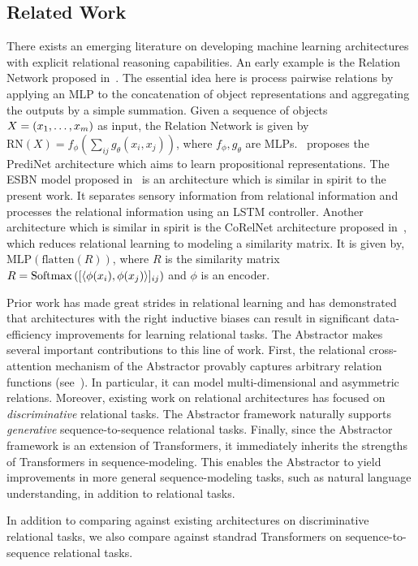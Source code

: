 \subsection{Related Work}

There exists an emerging literature on developing machine learning architectures with explicit relational reasoning capabilities. An early example is the Relation Network proposed in~\citep{santoro1}. The essential idea here is process pairwise relations by applying an MLP to the concatenation of object representations and aggregating the outputs by a simple summation. Given a sequence of objects $X = (x_1, \ldots, x_m)$ as input, the Relation Network is given by $\mathrm{RN}(X) = f_\phi(\sum_{ij} g_\theta(x_i, x_j))$, where $f_\phi, g_\theta$ are MLPs.~\citep{shanahanExplicitlyRelationalNeural} proposes the PrediNet architecture which aims to learn propositional representations. The ESBN model proposed in~\citep{esbn} is an architecture which is similar in spirit to the present work. It separates sensory information from relational information and processes the relational information using an LSTM controller. Another architecture which is similar in spirit is the CoRelNet architecture proposed in~\citep{kerg2022neural}, which reduces relational learning to modeling a similarity matrix. It is given by, $\mathrm{MLP}(\mathrm{flatten}(R))$, where $R$ is the similarity matrix $R = \mathrm{Softmax}\left([\left \langle \phi(x_i), \phi(x_j) \right\rangle]_{ij}\right)$ and $\phi$ is an encoder.

Prior work has made great strides in relational learning and has demonstrated that architectures with the right inductive biases can result in significant data-efficiency improvements for learning relational tasks. The Abstractor makes several important contributions to this line of work. First, the relational cross-attention mechanism of the Abstractor provably captures arbitrary relation functions (see~). In particular, it can model multi-dimensional and asymmetric relations. Moreover, existing work on relational architectures has focused on \textit{discriminative} relational tasks. The Abstractor framework naturally supports \textit{generative} sequence-to-sequence relational tasks. Finally, since the Abstractor framework is an extension of Transformers, it immediately inherits the strengths of Transformers in sequence-modeling. This enables the Abstractor to yield improvements in more general sequence-modeling tasks, such as natural language understanding, in addition to relational tasks.

In addition to comparing against existing architectures on discriminative relational tasks, we also compare against standrad Transformers on sequence-to-sequence relational tasks.